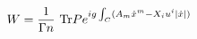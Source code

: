 \begin{equation}
W=\frac{1}{\Gamma n}\ \hbox{Tr} P e^{ig\int_C (A_m \dot x^m
-X_iu^i\vert \dot x\vert)}
\end{equation}

